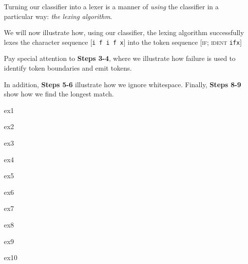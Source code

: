 Turning our classifier into a lexer is a manner of \emph{using} the classifier in a particular way: \emph{the lexing algorithm}. 

We will now illustrate how, using our classifier, the lexing algorithm successfully lexes the character sequence [\texttt{i f  i f x}] into the token sequence [\textsc{if}; \textsc{ident} \texttt{ifx}]

Pay special attention to \textbf{\textsf{Steps 3-4}}, where we illustrate how failure is used to identify token boundaries and emit tokens.

In addition, \textbf{\textsf{Steps 5-6}} illustrate how we ignore whitespace. Finally, \textbf{\textsf{Steps 8-9}} show how we find the longest match.
\vspace{3mm}

\begin{minipage}{0.5\textwidth}
    {ex1}
\end{minipage}%
\begin{minipage}{0.5\textwidth}
    {ex2}
\end{minipage}

\begin{minipage}{0.5\textwidth}
    {ex3}
\end{minipage}%
\begin{minipage}{0.5\textwidth}
    {ex4}
\end{minipage}

\begin{minipage}{0.5\textwidth}
    {ex5}
\end{minipage}%
\begin{minipage}{0.5\textwidth}
    {ex6}
\end{minipage}

\begin{minipage}{0.5\textwidth}
    {ex7}
\end{minipage}%
\begin{minipage}{0.5\textwidth}
    {ex8}
\end{minipage}

\begin{minipage}{0.5\textwidth}
    {ex9}
\end{minipage}%
\begin{minipage}{0.5\textwidth}
    {ex10}
\end{minipage}

